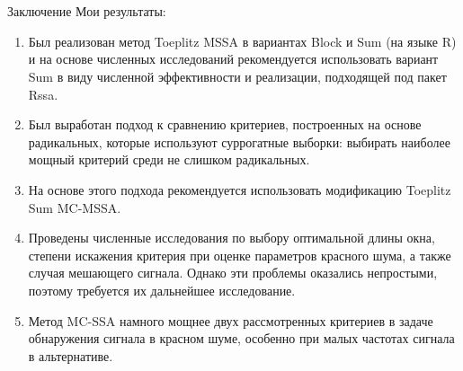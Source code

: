 \documentclass[pdf,notheorems,10pt,intlimits, unicode]{beamer}
\begin{document}
\section{}
\begin{frame}{Заключение}
  Мои результаты:
	\begin{enumerate}
		\item Был реализован метод Toeplitz MSSA в вариантах Block и Sum (на языке \textsf{R}) и на основе численных исследований рекомендуется использовать вариант Sum в виду численной эффективности и реализации, подходящей под пакет \textsf{Rssa}.
		\item Был выработан подход к сравнению критериев, построенных на основе радикальных, которые используют суррогатные выборки: выбирать наиболее мощный критерий среди не слишком радикальных.
		\item На основе этого подхода рекомендуется использовать модификацию Toeplitz Sum MC-MSSA.
    \item Проведены численные исследования по выбору оптимальной длины окна, степени искажения критерия при оценке параметров красного шума, а также случая мешающего сигнала. Однако эти проблемы оказались непростыми, поэтому требуется их дальнейшее исследование.
    \item Метод MC-SSA намного мощнее двух рассмотренных критериев в задаче обнаружения сигнала в красном шуме, особенно при малых частотах сигнала в альтернативе.
  \end{enumerate}
\end{frame}
\end{document}
